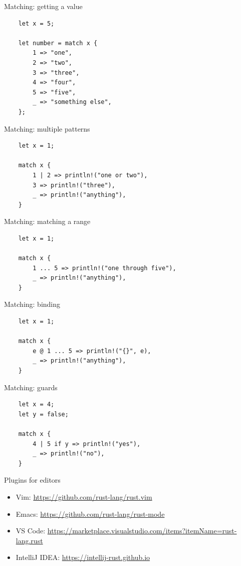 \documentclass[12pt, aspectratio=169]{beamer}
\begin{document}
\begin{frame}[fragile]{Matching: getting a value}
  \begin{verbatim}
    let x = 5;

    let number = match x {
        1 => "one",
        2 => "two",
        3 => "three",
        4 => "four",
        5 => "five",
        _ => "something else",
    };
  \end{verbatim}
\end{frame}

\begin{frame}[fragile]{Matching: multiple patterns}
  \begin{verbatim}
    let x = 1;

    match x {
        1 | 2 => println!("one or two"),
        3 => println!("three"),
        _ => println!("anything"),
    }
  \end{verbatim}
\end{frame}

\begin{frame}[fragile]{Matching: matching a range}
  \begin{verbatim}
    let x = 1;

    match x {
        1 ... 5 => println!("one through five"),
        _ => println!("anything"),
    }
  \end{verbatim}
\end{frame}

\begin{frame}[fragile]{Matching: binding}
  \begin{verbatim}
    let x = 1;

    match x {
        e @ 1 ... 5 => println!("{}", e),
        _ => println!("anything"),
    }
  \end{verbatim}
\end{frame}

\begin{frame}[fragile]{Matching: guards}
  \begin{verbatim}
    let x = 4;
    let y = false;

    match x {
        4 | 5 if y => println!("yes"),
        _ => println!("no"),
    }
  \end{verbatim}
\end{frame}

\begin{frame}{Plugins for editors}
  \begin{itemize}
    \item Vim: \url{https://github.com/rust-lang/rust.vim}
    \item Emacs: \url{https://github.com/rust-lang/rust-mode}
    \item VS Code: \url{https://marketplace.visualstudio.com/items?itemName=rust-lang.rust}
    \item IntelliJ IDEA: \url{https://intellij-rust.github.io}
  \end{itemize}
\end{frame}
\end{document}
